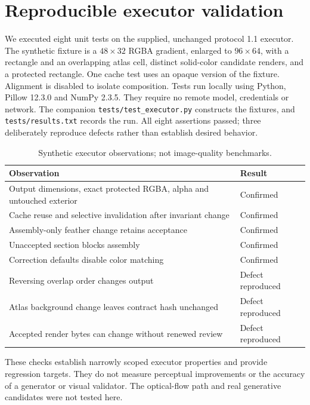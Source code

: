 \documentclass[10pt,twocolumn]{article}
\begin{document}
\section{Reproducible executor validation}
We executed eight unit tests on the supplied, unchanged protocol 1.1 executor. The synthetic fixture is a $48\times32$ RGBA gradient, enlarged to $96\times64$, with a rectangle and an overlapping atlas cell, distinct solid-color candidate renders, and a protected rectangle. One cache test uses an opaque version of the fixture. Alignment is disabled to isolate composition. Tests run locally using Python, Pillow 12.3.0 and NumPy 2.3.5. They require no remote model, credentials or network. The companion \texttt{tests/test\_executor.py} constructs the fixtures, and \texttt{tests/results.txt} records the run. All eight assertions passed; three deliberately reproduce defects rather than establish desired behavior.
\begin{table}[h]
\centering\small
\caption{Synthetic executor observations; not image-quality benchmarks.}\label{tab:tests}
\begin{tabularx}{\columnwidth}{@{}Xp{}@{}}
\toprule Observation & Result \\\midrule
Output dimensions, exact protected RGBA, alpha and untouched exterior & Confirmed \\
Cache reuse and selective invalidation after invariant change & Confirmed \\
Assembly-only feather change retains acceptance & Confirmed \\
Unaccepted section blocks assembly & Confirmed \\
Correction defaults disable color matching & Confirmed \\
Reversing overlap order changes output & Defect reproduced \\
Atlas background change leaves contract hash unchanged & Defect reproduced \\
Accepted render bytes can change without renewed review & Defect reproduced \\\bottomrule
\end{tabularx}
\end{table}
These checks establish narrowly scoped executor properties and provide regression targets. They do not measure perceptual improvements or the accuracy of a generator or visual validator. The optical-flow path and real generative candidates were not tested here.
\end{document}
